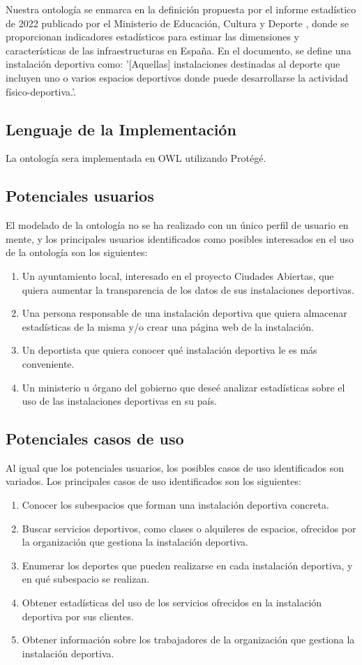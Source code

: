 \documentclass[a4paper,12pt]{article}
\begin{document}
	Nuestra ontología se enmarca en la definición propuesta por el informe estadístico de 2022 publicado por el Ministerio de Educación, Cultura y Deporte \cite{pdf-culturaydeporte}, donde se proporcionan indicadores estadísticos para estimar las dimensiones y características de las infraestructuras en España. En el documento, se define una instalación deportiva como: '[Aquellas] instalaciones destinadas al deporte que incluyen uno o varios espacios deportivos donde puede desarrollarse la actividad físico-deportiva.'.
	
	\subsection{Lenguaje de la Implementación}
	La ontología sera implementada en OWL utilizando Protégé.
	
	\subsection{Potenciales usuarios}
	El modelado de la ontología no se ha realizado con un único perfil de usuario en mente, y los principales usuarios identificados como posibles interesados en el uso de la ontología son los siguientes:
	\begin{enumerate}
		\item Un ayuntamiento local, interesado en el proyecto Ciudades Abiertas, que quiera aumentar la transparencia de los datos de sus instalaciones deportivas.
		\item Una persona responsable de una instalación deportiva que quiera almacenar estadísticas de la misma y/o crear una página web de la instalación.
		\item Un deportista que quiera conocer qué instalación deportiva le es más conveniente.
		\item Un ministerio u órgano del gobierno que deseé analizar estadísticas sobre el uso de las instalaciones deportivas en su país.
	\end{enumerate}

	\subsection{Potenciales casos de uso}
	Al igual que los potenciales usuarios, los posibles casos de uso identificados son variados. Los principales casos de uso identificados son los siguientes:
	\begin{enumerate}
		\item Conocer los subespacios que forman una instalación deportiva concreta.
		\item Buscar servicios deportivos, como clases o alquileres de espacios, ofrecidos por la organización que gestiona la instalación deportiva.
		\item Enumerar los deportes que pueden realizarse en cada instalación deportiva, y en qué subespacio se realizan.
		\item Obtener estadísticas del uso de los servicios ofrecidos en la instalación deportiva por sus clientes.
		\item Obtener información sobre los trabajadores de la organización que gestiona la instalación deportiva.
	\end{enumerate}
	
\end{document}
